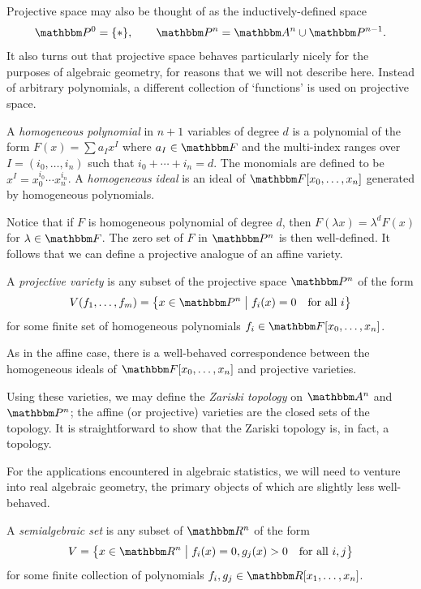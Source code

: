 \documentclass[11pt,titlepage]{article}
\newcommand*{\vbar}{\;\big\vert\;}
\begin{document}
    Projective space may also be thought of as the inductively-defined space
    \[
        \Proj^0 = \{\ast\}, \qquad \Proj^n = \A^n \cup \Proj^{n-1}.
    \]
    It also turns out that projective space behaves particularly nicely for the
    purposes of algebraic geometry, for reasons that we will not describe here.
    Instead of arbitrary polynomials, a different collection of `functions' is
    used on projective space.
    \begin{definition}
        A \emph{homogeneous polynomial} in $n+1$ variables of degree $d$ is a
        polynomial of the form $F(x) = \sum a_I x^I$ where $a_I \in \F$ and the
        multi-index ranges over $I = (i_0, \ldots, i_n)$ such that $i_0 + \cdots
        + i_n = d$.  The monomials are defined to be $x^I = x_0^{i_0}\cdots
        x_n^{i_n}$.  A \emph{homogeneous ideal} is an ideal of $\F[x_0, \ldots,
        x_n]$ generated by homogeneous polynomials.
    \end{definition}
    Notice that if $F$ is homogeneous polynomial of degree $d$, then $F(\lambda
    x) = \lambda^d F(x)$ for $\lambda \in \F$.  The zero set of $F$ in $\Proj^n$
    is then well-defined.  It follows that we can define a projective analogue
    of an affine variety.
    \begin{definition}
        A \emph{projective variety} is any subset of the projective space
        $\Proj^n$ of the form
        \[
            V(f_1, \ldots, f_m)
            = \cdil[\big]{x \in \Proj^n \vbar f_i(x) = 0 \quad\text{for all $i$}}
        \]
        for some finite set of homogeneous polynomials $f_i \in \F[x_0,
        \ldots,x_n]$.
    \end{definition}
    As in the affine case, there is a well-behaved correspondence between the
    homogeneous ideals of $\F[x_0, \ldots, x_n]$ and projective varieties.

    Using these varieties, we may define the \emph{Zariski topology} on $\A^n$
    and $\Proj^n$;  the affine (or projective) varieties are the closed sets of
    the topology.  It is straightforward to show that the Zariski topology is,
    in fact, a topology.

    For the applications encountered in algebraic statistics, we will need to
    venture into real algebraic geometry, the primary objects of which are
    slightly less well-behaved.
    \begin{definition}
        A \emph{semialgebraic set} is any subset of $\R^n$ of the form
        \[
            V = \cdil[\big]{ x \in \R^n \vbar
                f_i(x) = 0, g_j(x) > 0
            \quad\text{for all $i,j$}}
        \]
        for some finite collection of polynomials $f_i, g_j \in \R[x_1, \ldots,
        x_n]$.
    \end{definition}
\end{document}
